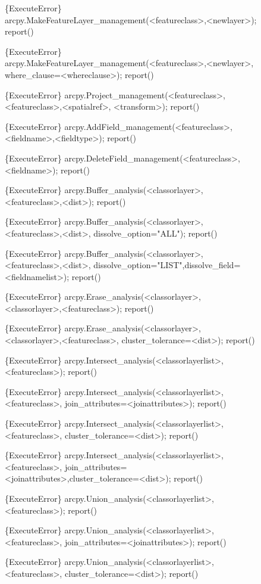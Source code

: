 \begin{figure}
{\scriptsize
\begin{code}
\{ExecuteError\} arcpy.MakeFeatureLayer\_management(<featureclass>,<newlayer>); report()

\{ExecuteError\} arcpy.MakeFeatureLayer\_management(<featureclass>,<newlayer>,
   where\_clause=<whereclause>); report()

\{ExecuteError\} arcpy.Project\_management(<featureclass>,<featureclass>,<spatialref>,
   <transform>); report()

\{ExecuteError\} arcpy.AddField\_management(<featureclass>,<fieldname>,<fieldtype>);
   report()

\{ExecuteError\} arcpy.DeleteField\_management(<featureclass>,<fieldname>); report()

\{ExecuteError\} arcpy.Buffer\_analysis(<classorlayer>,<featureclass>,<dist>); report()

\{ExecuteError\} arcpy.Buffer\_analysis(<classorlayer>,<featureclass>,<dist>,
   dissolve\_option="ALL"); report()

\{ExecuteError\} arcpy.Buffer\_analysis(<classorlayer>,<featureclass>,<dist>,
   dissolve\_option="LIST",dissolve\_field=<fieldnamelist>); report()

\{ExecuteError\} arcpy.Erase\_analysis(<classorlayer>,<classorlayer>,<featureclass>);
   report()

\{ExecuteError\} arcpy.Erase\_analysis(<classorlayer>,<classorlayer>,<featureclass>,
   cluster\_tolerance=<dist>); report()

\{ExecuteError\} arcpy.Intersect\_analysis(<classorlayerlist>,<featureclass>); report()

\{ExecuteError\} arcpy.Intersect\_analysis(<classorlayerlist>,<featureclass>,
   join\_attributes=<joinattributes>); report()

\{ExecuteError\} arcpy.Intersect\_analysis(<classorlayerlist>,<featureclass>,
   cluster\_tolerance=<dist>); report()

\{ExecuteError\} arcpy.Intersect\_analysis(<classorlayerlist>,<featureclass>,
   join\_attributes=<joinattributes>,cluster\_tolerance=<dist>); report()

\{ExecuteError\} arcpy.Union\_analysis(<classorlayerlist>,<featureclass>); report()

\{ExecuteError\} arcpy.Union\_analysis(<classorlayerlist>,<featureclass>,
   join\_attributes=<joinattributes>); report()

\{ExecuteError\} arcpy.Union\_analysis(<classorlayerlist>,<featureclass>,
   cluster\_tolerance=<dist>); report()


\end{code}}
\end{figure}
